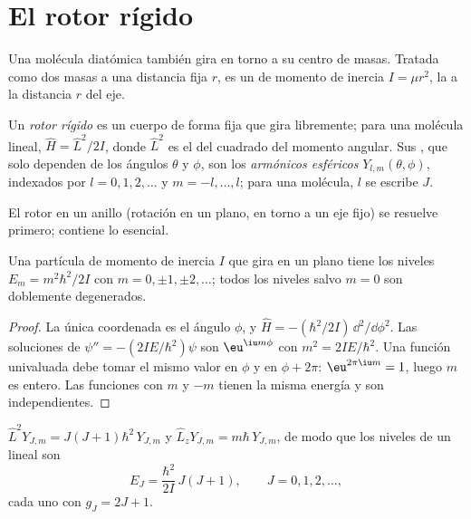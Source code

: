 \section{El rotor rígido}

Una molécula diatómica también gira en torno a su centro de masas. Tratada como dos
masas a una distancia fija $r$, es un  de momento de inercia
$I = \mu r^2$, la  a la distancia $r$ del eje.

\begin{definition}\label{def:b3:quantum-model-systems:rotor}
Un \emph{rotor rígido} es un cuerpo de forma fija que gira
libremente; para una molécula lineal, $\hat H = \hat L^2/2I$, donde $\hat L^2$ es el
 del cuadrado del momento angular. Sus , que
solo dependen de los ángulos $\theta$ y $\phi$, son los \emph{armónicos
esféricos} $Y_{l,m}(\theta,\phi)$, indexados por $l =
0, 1, 2, \dots$ y $m = -l, \dots, l$; para una molécula, $l$ se escribe $J$.
\end{definition}

El rotor en un anillo (rotación en un plano, en torno a un eje fijo) se resuelve
primero; contiene lo esencial.

\begin{theorem}[El anillo]\label{thm:b3:quantum-model-systems:ring}
Una partícula de momento de inercia $I$ que gira en un plano tiene los niveles
$E_m = m^2\hbar^2/2I$ con $m = 0, \pm1, \pm2, \dots$; todos los niveles salvo $m = 0$
son doblemente degenerados.
\end{theorem}

\begin{proof}
La única coordenada es el ángulo $\phi$, y $\hat H = -(\hbar^2/2I)\,
\dd^2/\dd\phi^2$. Las soluciones de $\psi'' = -(2IE/\hbar^2)\psi$ son $\eu^{\iu
m\phi}$ con $m^2 = 2IE/\hbar^2$. Una función univaluada debe tomar el mismo
valor en $\phi$ y en $\phi + 2\pi$: $\eu^{2\pi\iu m} = 1$, luego $m$ es entero.
Las funciones con $m$ y $-m$ tienen la misma energía y son independientes.
\end{proof}

\begin{theorem}\label{thm:b3:quantum-model-systems:rotor}
$\hat L^2Y_{J,m} = J(J+1)\hbar^2\,Y_{J,m}$ y $\hat L_zY_{J,m} = m\hbar\,
Y_{J,m}$, de modo que los niveles de un  lineal son
\[
E_J = \frac{\hbar^2}{2I}\,J(J+1), \qquad J = 0, 1, 2, \dots,
\]
cada uno con  $g_J = 2J + 1$.
\end{theorem}
\admitted

